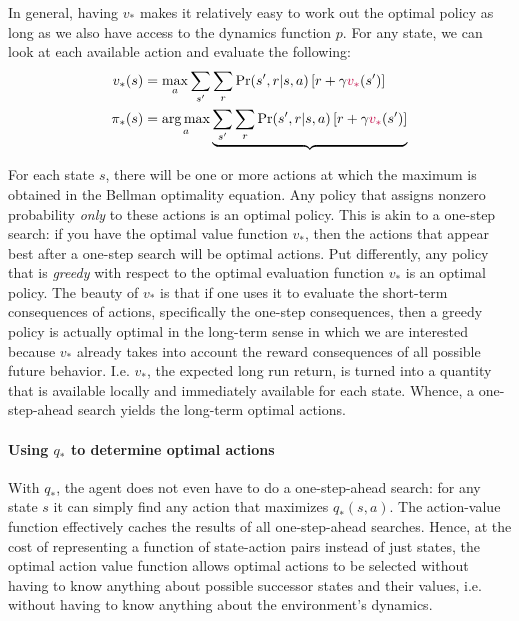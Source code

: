 \documentclass[12pt]{article}
\DeclareMathOperator*{\argmax}{arg\,max}
\begin{document}
In general, having $v_*$ makes it relatively easy to work out the optimal policy as long as we also have access to the dynamics function $p$. For any state, we can look at each available action and evaluate the following:
\begin{align*}
  v_*(s) &= \max_a \sum_{s'} \sum_r \Pr(s',r|s,a) \left[ r + \gamma   \color{purple} v_* \color{black}(s')\right] \\
  \pi_*(s) &= \argmax_a \underbrace{\sum_{s'} \sum_r \Pr(s',r|s,a)\left[r+\gamma \color{purple} v_* \color{black}(s')\right]}
\end{align*}


For each state $s$, there will be one or more actions at which the maximum is obtained in the Bellman optimality equation. Any policy that assigns nonzero probability \emph{only} to these actions is an optimal policy. This is akin to a one-step search: if you have the optimal value function $v_*$, then the actions that appear best after a one-step search will be optimal actions. Put differently, any policy that is \emph{greedy} with respect to the optimal evaluation function $v_*$ is an optimal policy. The beauty of $v_*$ is that if one uses it to evaluate the short-term consequences of actions, specifically the one-step consequences, then a greedy policy is actually optimal in the long-term sense in which we are interested because $v_*$ already takes into account the reward consequences of all possible future behavior. I.e. $v_*$, the expected long run return, is turned into a quantity that is available locally and immediately available for each state. Whence, a one-step-ahead search yields the long-term optimal actions.
\paragraph{Using $q_*$ to determine optimal actions} With $q_*$, the agent does not even have to do a one-step-ahead search: for any state $s$ it can simply find any action that maximizes $q_*(s,a)$. The action-value function effectively caches the results of all one-step-ahead searches. Hence, at the cost of representing a function of state-action pairs instead of just states, the optimal action value function allows optimal actions to be selected without having to know anything about possible successor states and their values, i.e. without having to know anything about the environment's dynamics.
\end{document}
